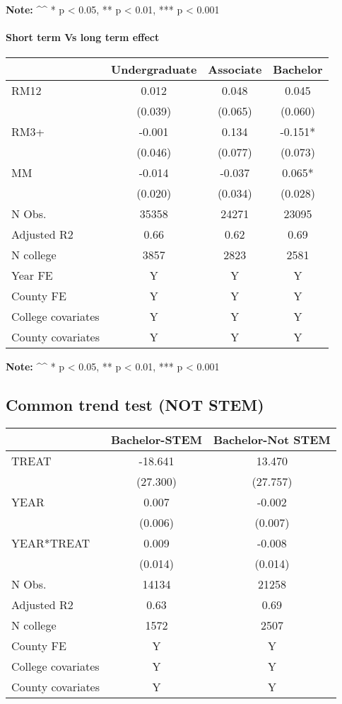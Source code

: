 \documentclass[
  landscape]{article}
\begin{document}
\textbf{Note:} \^{}\^{} * p \textless{} 0.05, ** p \textless{} 0.01, ***
p \textless{} 0.001

\newpage

\hypertarget{short-term-vs-long-term-effect}{%
\paragraph{Short term Vs long term
effect}\label{short-term-vs-long-term-effect}}

\begin{longtable}[]{@{}lccc@{}}
\toprule
& Undergraduate & Associate & Bachelor \\
\midrule
\endhead
RM12 & 0.012 & 0.048 & 0.045 \\
& (0.039) & (0.065) & (0.060) \\
RM3+ & -0.001 & 0.134 & -0.151* \\
& (0.046) & (0.077) & (0.073) \\
MM & -0.014 & -0.037 & 0.065* \\
& (0.020) & (0.034) & (0.028) \\
N Obs. & 35358 & 24271 & 23095 \\
Adjusted R2 & 0.66 & 0.62 & 0.69 \\
N college & 3857 & 2823 & 2581 \\
Year FE & Y & Y & Y \\
County FE & Y & Y & Y \\
College covariates & Y & Y & Y \\
County covariates & Y & Y & Y \\
\bottomrule
\end{longtable}

\textbf{Note:} \^{}\^{} * p \textless{} 0.05, ** p \textless{} 0.01, ***
p \textless{} 0.001

\newpage

\hypertarget{common-trend-test-not-stem}{%
\subsection{Common trend test (NOT
STEM)}\label{common-trend-test-not-stem}}

\begin{longtable}[]{@{}lcc@{}}
\toprule
& Bachelor-STEM & Bachelor-Not STEM \\
\midrule
\endhead
TREAT & -18.641 & 13.470 \\
& (27.300) & (27.757) \\
YEAR & 0.007 & -0.002 \\
& (0.006) & (0.007) \\
YEAR*TREAT & 0.009 & -0.008 \\
& (0.014) & (0.014) \\
N Obs. & 14134 & 21258 \\
Adjusted R2 & 0.63 & 0.69 \\
N college & 1572 & 2507 \\
County FE & Y & Y \\
College covariates & Y & Y \\
County covariates & Y & Y \\
\bottomrule
\end{longtable}
\end{document}

